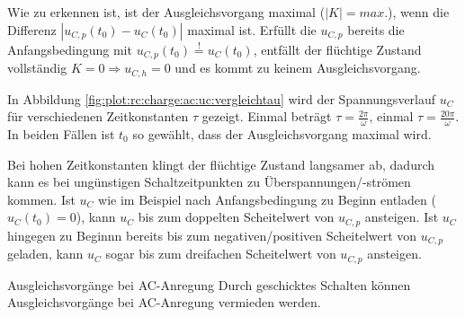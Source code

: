 \begin{frame}[t]
{    Wie zu erkennen ist, ist der Ausgleichsvorgang maximal ($|K|=max.$), wenn die Differenz $|u_{C,p}(t_0)- u_C(t_0)|$ maximal ist.
    Erfüllt die $u_{C,p}$ bereits die Anfangsbedingung mit $u_{C,p}(t_0)\overset{!}{=}u_C(t_0)$, entfällt der flüchtige Zustand vollständig $K=0 \Rightarrow u_{C,h}=0$ und es kommt zu keinem Ausgleichsvorgang.

    In Abbildung \ref{fig:plot:rc:charge:ac:uc:vergleichtau} wird der Spannungsverlauf $u_C$ für verschiedenen Zeitkonstanten $\tau$ gezeigt.
    Einmal beträgt $\tau=\frac{2\pi}{\omega}$, einmal $\tau=\frac{20\pi}{\omega}$.
    In beiden Fällen ist $t_0$ so gewählt, dass der Ausgleichsvorgang maximal wird.

    Bei hohen Zeitkonstanten klingt der flüchtige Zustand langsamer ab, dadurch kann es bei ungünstigen Schaltzeitpunkten zu Überspannungen/-strömen kommen.
    Ist $u_C$ wie im Beispiel nach Anfangsbedingung zu Beginn entladen ($u_C(t_0)=0$), kann $u_C$ bis zum doppelten Scheitelwert von $u_{C,p}$ ansteigen.
    Ist $u_C$ hingegen zu Beginnn bereits bis zum negativen/positiven Scheitelwert von $u_{C,p}$ geladen, kann $u_C$ sogar bis zum dreifachen Scheitelwert von $u_{C,p}$ ansteigen.

    \begin{Merksatz}{Ausgleichsvorgänge bei AC-Anregung}
        Durch geschicktes Schalten können Ausgleichsvorgänge bei AC-Anregung vermieden werden.\vspace{5pt}


\end{Merksatz}}
\end{frame}
